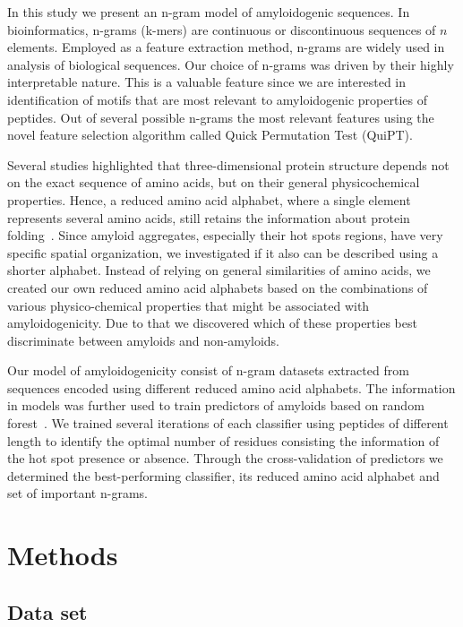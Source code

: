 \documentclass[a4,center,fleqn]{NAR}
\begin{document}
\enlargethispage{-65.1pt}

  In this study we present an n-gram model of amyloidogenic sequences. In 
bioinformatics, n-grams (k-mers) are continuous or discontinuous sequences of 
$n$ elements. Employed as a feature extraction method, n-grams are widely used 
in analysis of biological sequences. Our choice of n-grams was driven by their 
highly interpretable nature. This is a valuable feature since we are interested 
in identification of motifs that are most relevant to amyloidogenic properties 
of peptides. Out of several possible n-grams the most relevant features using 
the novel feature selection algorithm called Quick Permutation Test (QuiPT).

  Several studies highlighted that three-dimensional protein structure depends 
not on the exact sequence of amino acids, but on their general physicochemical 
properties. Hence, a reduced amino acid alphabet, where a single element 
represents several amino acids, still retains the information about protein 
folding~\citep{murphy_simplified_2000}. Since amyloid aggregates, especially 
their hot spots regions, have very specific spatial organization, we 
investigated if it also can be described using a shorter alphabet. Instead of 
relying on general similarities of amino acids, we created our own reduced amino 
acid alphabets based on the combinations of various physico-chemical properties that might be associated with amyloidogenicity. Due to that we discovered which of these
properties best discriminate between amyloids and non-amyloids.

  Our model of amyloidogenicity consist of n-gram datasets extracted from 
sequences encoded using different reduced amino acid alphabets. The information 
in models was further used to train predictors of amyloids based on random 
forest~\citep{breiman_random_2001}. We trained several iterations of each 
classifier using peptides of different length to identify the optimal number of 
residues consisting the information of the hot spot presence or absence. 
Through the cross-validation of predictors we determined the best-performing 
classifier, its reduced amino acid alphabet and set of important n-grams.


\section{Methods}
\subsection{Data set}
\end{document}
